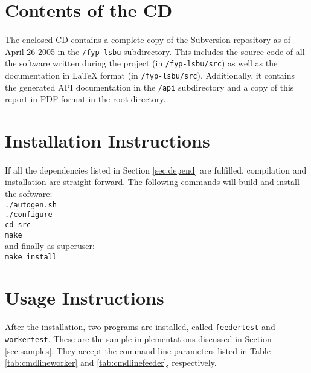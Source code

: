 \appendix
\appendixpage
\addappheadtotoc


\section{Contents of the CD}
\paragraph{}
The enclosed CD contains a complete copy of the Subversion repository as of April 26 2005 in the \texttt{/fyp-lsbu} subdirectory. This includes the source code of all the software written during the project (in \texttt{/fyp-lsbu/src}) as well as the documentation in \LaTeX{} format (in \texttt{/fyp-lsbu/src}). Additionally, it contains the generated API documentation in the \texttt{/api} subdirectory and a copy of this report in PDF format in the root directory.

\section{Installation Instructions}
\paragraph{}
If all the dependencies listed in Section \ref{sec:depend} are fulfilled, compilation and installation are straight-forward. The following commands will build and install the software:
\\ \texttt{./autogen.sh}
\\ \texttt{./configure}
\\ \texttt{cd src}
\\ \texttt{make} \\

and finally as superuser:
\\ \texttt{make install} \\

\section{Usage Instructions}
\paragraph{}
After the installation, two programs are installed, called \texttt{feedertest} and \texttt{workertest}. These are the sample implementations discussed in Section \ref{sec:samples}. They accept the command line parameters listed in Table \ref{tab:cmdlineworker} and \ref{tab:cmdlinefeeder}, respectively.

